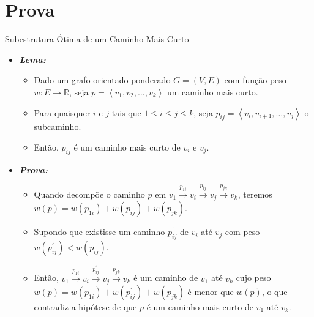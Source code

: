 \documentclass{beamer}
\begin{document}
\section{Prova}
	\begin{frame}{Subestrutura Ótima de um Caminho Mais Curto \cite{cormen2002algoritmos}}
		\begin{itemize}
			\item \textit{\textbf{Lema:}}
			\begin{itemize}
				\item Dado um grafo orientado ponderado $G = (V, E)$ com função peso $w : E \rightarrow \mathbb{R}$, seja $p = \left \langle v_{1}, v_{2}, \ldots, v_{k}\right \rangle$ um caminho mais curto.
				
				\item Para quaisquer $i$ e $j$ tais que $1 \le i \le j \le k$, seja $p_{ij}= \left \langle v_{i}, v_{i + 1}, \ldots, v_{j}\right \rangle$ o subcaminho. 
				
				\item Então, $p_{ij}$ é um caminho mais curto de $v_i$ e $v_j$.
			\end{itemize}
			
			\pause
			
			\item \textit{\textbf{Prova:}}
			\begin{itemize}
				\item  Quando decompõe o caminho $p$ em $v_1 \xrightarrow{p_{1i}} v_i \xrightarrow{p_{ij}} v_j \xrightarrow{p_{jk}} v_k$, teremos $w(p) = w(p_{1i}) + w(p_{ij}) + w(p_{jk})$. 
				
				\item Supondo que existisse um caminho $p^\prime_{ij}$ de $v_i$ até $v_j$ com peso $w(p^\prime_{ij}) < w(p_{ij})$. 
				
				\item Então, $v_1 \xrightarrow{p_{1i}} v_i \xrightarrow{p^\prime_{ij}} v_j \xrightarrow{p_{jk}} v_k$ é um caminho de $v_1$ até $v_k$ cujo peso $w(p) = w(p_{1i}) + w(p^\prime_{ij}) + w(p_{jk})$ é menor que $w(p)$, o que contradiz a hipótese de que $p$ é um caminho mais curto de $v_1$ até $v_k$.
			\end{itemize}
		\end{itemize}
	\end{frame}
	
\end{document}
